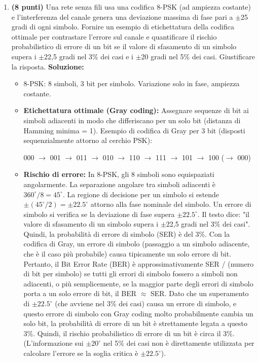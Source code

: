 \documentclass[12pt,a4paper]{article}
\begin{document}
\begin{enumerate}[label=\textbf{\arabic*.}, wide, labelindent=0pt, leftmargin=*]
    \item \textbf{(8 punti)} Una rete senza fili usa una codifica 8-PSK (ad ampiezza costante) e l'interferenza del canale genera una deviazione massima di fase pari a $\pm$25 gradi di ogni simbolo. Fornire un esempio di etichettatura della codifica ottimale per contrastare l'errore sul canale e quantificare il rischio probabilistico di errore di un bit se il valore di sfasamento di un simbolo supera i $\pm$22,5 gradi nel 3\% dei casi e i $\pm$20 gradi nel 5\% dei casi. Giustificare la risposta.
    \newline\textbf{Soluzione:}
    \begin{itemize}
        \item 8-PSK: 8 simboli, 3 bit per simbolo. Variazione solo in fase, ampiezza costante.
        \item \textbf{Etichettatura ottimale (Gray coding):} Assegnare sequenze di bit ai simboli adiacenti in modo che differiscano per un solo bit (distanza di Hamming minima = 1). Esempio di codifica di Gray per 3 bit (disposti sequenzialmente attorno al cerchio PSK):
        \begin{center}
            000 $\rightarrow$ 001 $\rightarrow$ 011 $\rightarrow$ 010 $\rightarrow$ 110 $\rightarrow$ 111 $\rightarrow$ 101 $\rightarrow$ 100 ($\rightarrow$ 000)
        \end{center}
        \item \textbf{Rischio di errore:}
        In 8-PSK, gli 8 simboli sono equispaziati angolarmente. La separazione angolare tra simboli adiacenti è $360^\circ / 8 = 45^\circ$.
        La regione di decisione per un simbolo si estende $\pm (45^\circ / 2) = \pm 22.5^\circ$ attorno alla fase nominale del simbolo.
        Un errore di simbolo si verifica se la deviazione di fase supera $\pm 22.5^\circ$.
        Il testo dice: "il valore di sfasamento di un simbolo supera i $\pm$22,5 gradi nel 3\% dei casi".
        Quindi, la probabilità di errore di simbolo (SER) è del 3\%.
        Con la codifica di Gray, un errore di simbolo (passaggio a un simbolo adiacente, che è il caso più probabile) causa tipicamente un solo errore di bit.
        Pertanto, il Bit Error Rate (BER) è approssimativamente SER / (numero di bit per simbolo) se tutti gli errori di simbolo fossero a simboli non adiacenti, o più semplicemente, se la maggior parte degli errori di simbolo porta a un solo errore di bit, il BER $\approx$ SER.
        Dato che un superamento di $\pm 22.5^\circ$ (che avviene nel 3\% dei casi) causa un errore di simbolo, e questo errore di simbolo con Gray coding molto probabilmente cambia un solo bit, la probabilità di errore di un bit è strettamente legata a questo 3\%.
        Quindi, il rischio probabilistico di errore di un bit è circa il 3\%.
        (L'informazione sui $\pm 20^\circ$ nel 5\% dei casi non è direttamente utilizzata per calcolare l'errore se la soglia critica è $\pm 22.5^\circ$).
    \end{itemize}


\end{enumerate}
\end{document}
